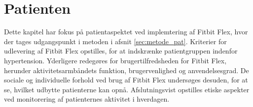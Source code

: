 \chapter{Patienten}
Dette kapitel har fokus på patientaspektet ved implemtering af Fitbit Flex, hvor der tages udgangspunkt i metoden i afsnit \autoref{sec:metode_pat}. Kriterier for udlevering af Fitbit Flex opstilles, for at indskrænke patientgruppen indenfor hypertension. Yderligere redegøres for brugertilfredsheden for Fitbit Flex, herunder aktivitetsarmbåndets funktion, brugervenlighed og anvendelsesgrad. De sociale og individuelle forhold ved brug af Fitbit Flex undersøges desuden, for at se, hvilket udbytte patienterne kan opnå. Afslutningsvist opstilles etiske aspekter ved monitorering af patienternes aktivitet i hverdagen.




